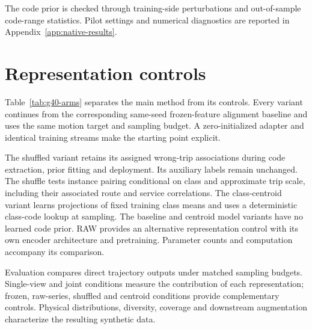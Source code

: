 The code prior is checked through training-side perturbations and out-of-sample code-range statistics. Pilot settings and numerical diagnostics are reported in Appendix~\ref{app:native-results}.

\section{Representation controls}
Table~\ref{tab:g40-arms} separates the main method from its controls. Every variant continues from the corresponding same-seed frozen-feature alignment baseline and uses the same motion target and sampling budget. A zero-initialized adapter and identical training streams make the starting point explicit.


The shuffled variant retains its assigned wrong-trip associations during code extraction, prior fitting and deployment. Its auxiliary labels remain unchanged. The shuffle tests instance pairing conditional on class and approximate trip scale, including their associated route and service correlations. The class-centroid variant learns projections of fixed training class means and uses a deterministic class-code lookup at sampling. The baseline and centroid model variants have no learned code prior. RAW provides an alternative representation control with its own encoder architecture and pretraining. Parameter counts and computation accompany its comparison.

Evaluation compares direct trajectory outputs under matched sampling budgets. Single-view and joint conditions measure the contribution of each representation; frozen, raw-series, shuffled and centroid conditions provide complementary controls. Physical distributions, diversity, coverage and downstream augmentation characterize the resulting synthetic data.
